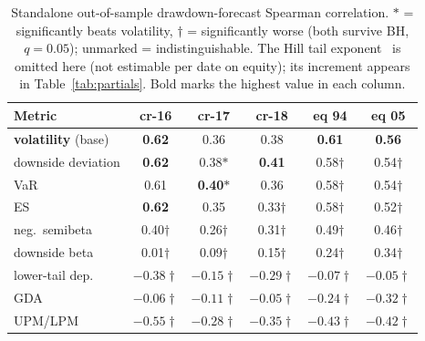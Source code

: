 \documentclass[sigconf,nonacm]{acmart}
\begin{document}
\begin{table}[t]
\centering
\caption{Standalone out-of-sample drawdown-forecast Spearman correlation.
$\ast$ = significantly beats volatility, $\dagger$ = significantly worse (both
survive BH, $q=0.05$); unmarked = indistinguishable. The Hill tail
exponent~\cite{kellyjiang2014} is omitted here (not estimable per date on
equity); its increment appears in Table~\ref{tab:partials}. Bold marks the highest value in each column.}
\label{tab:h2h}
\small
\begin{tabular}{lccccc}
\toprule
Metric & cr-16 & cr-17 & cr-18 & eq 94 & eq 05 \\
\midrule
\textbf{volatility} (base) & \textbf{0.62} & 0.36 & 0.38 & \textbf{0.61} & \textbf{0.56} \\
downside deviation & \textbf{0.62} & 0.38$\ast$ & \textbf{0.41} & 0.58$\dagger$ & 0.54$\dagger$ \\
VaR & 0.61 & \textbf{0.40}$\ast$ & 0.36 & 0.58$\dagger$ & 0.54$\dagger$ \\
ES~\cite{rockafellar2000} & \textbf{0.62} & 0.35 & 0.33$\dagger$ & 0.58$\dagger$ & 0.52$\dagger$ \\
neg.\ semibeta~\cite{bpq2022} & 0.40$\dagger$ & 0.26$\dagger$ & 0.31$\dagger$ & 0.49$\dagger$ & 0.46$\dagger$ \\
downside beta~\cite{ang2006} & 0.01$\dagger$ & 0.09$\dagger$ & 0.15$\dagger$ & 0.24$\dagger$ & 0.34$\dagger$ \\
lower-tail dep.~\cite{chabiyo2018} & $-0.38\dagger$ & $-0.15\dagger$ & $-0.29\dagger$ & $-0.07\dagger$ & $-0.05\dagger$ \\
GDA~\cite{faragotedongap2018} & $-0.06\dagger$ & $-0.11\dagger$ & $-0.05\dagger$ & $-0.24\dagger$ & $-0.32\dagger$ \\
UPM/LPM~\cite{violenawrocki2016} & $-0.55\dagger$ & $-0.28\dagger$ & $-0.35\dagger$ & $-0.43\dagger$ & $-0.42\dagger$ \\
\bottomrule
\end{tabular}
\end{table}

\end{document}
